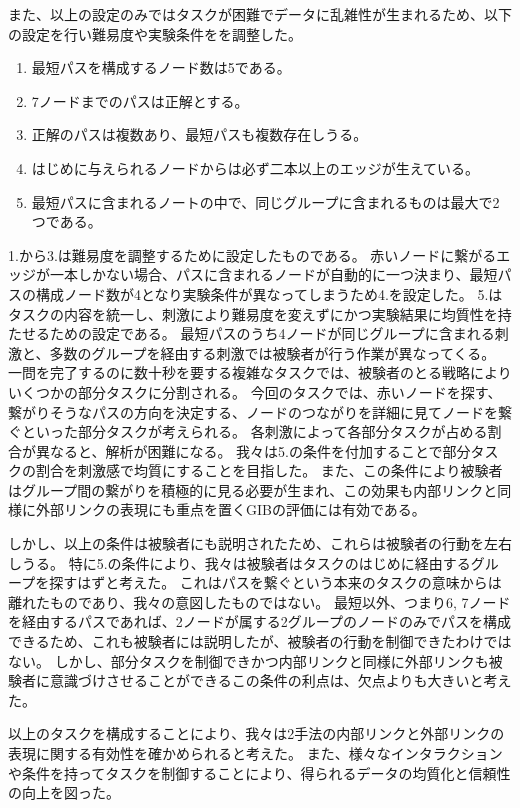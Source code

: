 \documentclass{kuee}
\begin{document}
また、以上の設定のみではタスクが困難でデータに乱雑性が生まれるため、以下の設定を行い難易度や実験条件をを調整した。
\begin{enumerate}
  \item 最短パスを構成するノード数は5である。
  \item 7ノードまでのパスは正解とする。
  \item 正解のパスは複数あり、最短パスも複数存在しうる。
  \item はじめに与えられるノードからは必ず二本以上のエッジが生えている。
  \item 最短パスに含まれるノートの中で、同じグループに含まれるものは最大で2つである。
\end{enumerate}
1.から3.は難易度を調整するために設定したものである。
赤いノードに繋がるエッジが一本しかない場合、パスに含まれるノードが自動的に一つ決まり、最短パスの構成ノード数が4となり実験条件が異なってしまうため4.を設定した。
5.はタスクの内容を統一し、刺激により難易度を変えずにかつ実験結果に均質性を持たせるための設定である。
最短パスのうち4ノードが同じグループに含まれる刺激と、多数のグループを経由する刺激では被験者が行う作業が異なってくる。
一問を完了するのに数十秒を要する複雑なタスクでは、被験者のとる戦略によりいくつかの部分タスクに分割される。
今回のタスクでは、赤いノードを探す、繋がりそうなパスの方向を決定する、ノードのつながりを詳細に見てノードを繋ぐといった部分タスクが考えられる。
各刺激によって各部分タスクが占める割合が異なると、解析が困難になる。
我々は5.の条件を付加することで部分タスクの割合を刺激感で均質にすることを目指した。
また、この条件により被験者はグループ間の繋がりを積極的に見る必要が生まれ、この効果も内部リンクと同様に外部リンクの表現にも重点を置くGIBの評価には有効である。

しかし、以上の条件は被験者にも説明されたため、これらは被験者の行動を左右しうる。
特に5.の条件により、我々は被験者はタスクのはじめに経由するグループを探すはずと考えた。
これはパスを繋ぐという本来のタスクの意味からは離れたものであり、我々の意図したものではない。
最短以外、つまり6, 7ノードを経由するパスであれば、2ノードが属する2グループのノードのみでパスを構成できるため、これも被験者には説明したが、被験者の行動を制御できたわけではない。
しかし、部分タスクを制御できかつ内部リンクと同様に外部リンクも被験者に意識づけさせることができるこの条件の利点は、欠点よりも大きいと考えた。

以上のタスクを構成することにより、我々は2手法の内部リンクと外部リンクの表現に関する有効性を確かめられると考えた。
また、様々なインタラクションや条件を持ってタスクを制御することにより、得られるデータの均質化と信頼性の向上を図った。
\end{document}

